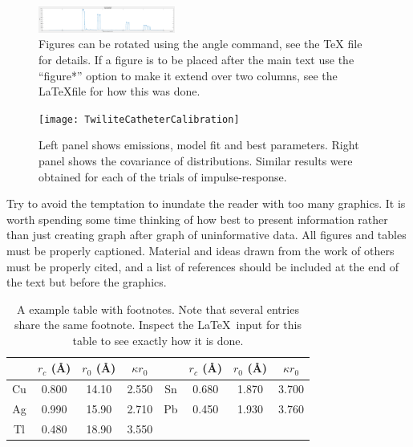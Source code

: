 \begin{figure}[htb]
\includegraphics[angle=90,width=4.5cm]{twilite-catheter-calibration-20190930.png}
\caption{Figures can be
rotated using the angle command, see the TeX file for details.  If a
figure is to be placed after the main text use the ``figure*'' option
to make it extend over two columns, see the \LaTeX file for how this
was done.}
\label{fig:twilite}
\end{figure}

\begin{figure}[htb]
\texttt{[image: TwiliteCatheterCalibration]}
\caption{Left panel shows emissions, model fit and best parameters.  Right panel
shows the covariance of distributions.  Similar results were obtained for each of the 
trials of impulse-response.}
\label{fig:twiliteCC_LRw}
\end{figure}

Try to avoid the temptation to inundate the reader with too many
graphics.  It is worth spending some time thinking of how best to
present information rather than just creating graph after graph of
uninformative data.  All figures and tables must be properly
captioned.  Material and ideas drawn from the work of others must be
properly cited, and a list of references should be included at the end
of the text but before the graphics.

\begin{table}[h]
\caption{\label{tab:table1}A example table with footnotes.  Note that several entries share the same
footnote. Inspect the \LaTeX\ input for this table to see
exactly how it is done.}
\begin{ruledtabular}
\begin{tabular}{cccccccc}
 &$r_c$ (\AA)&$r_0$ (\AA)&$\kappa r_0$&
 &$r_c$ (\AA) &$r_0$ (\AA)&$\kappa r_0$\\
\hline
Cu& 0.800 & 14.10 & 2.550 &Sn\footnotemark[1] & 0.680 & 1.870 & 3.700 \\
Ag& 0.990 & 15.90 & 2.710 &Pb\footnotemark[1] & 0.450 & 1.930 & 3.760 \\
Tl& 0.480 & 18.90 & 3.550 & & & & \\
\end{tabular}
\end{ruledtabular}
\end{table}




